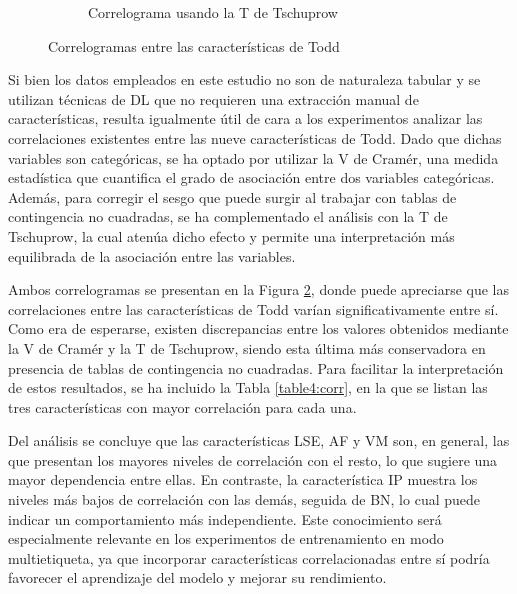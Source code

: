 \begin{figure}[p]
\begin{subfigure}{\textwidth}
        \caption{Correlograma usando la T de Tschuprow}
        \label{fig4:todd_chars__tschuprow}
    \end{subfigure}
    \caption[Correlogramas entre características de Todd]{Correlogramas entre las características de Todd}
    \label{fig4:todd_chars_correlogram}
\end{figure}

Si bien los datos empleados en este estudio no son de naturaleza tabular y se utilizan técnicas de DL que no requieren una extracción manual de características, resulta igualmente útil de cara a los experimentos analizar las correlaciones existentes entre las nueve características de Todd. Dado que dichas variables son categóricas, se ha optado por utilizar la V de Cramér, una medida estadística que cuantifica el grado de asociación entre dos variables categóricas. Además, para corregir el sesgo que puede surgir al trabajar con tablas de contingencia no cuadradas, se ha complementado el análisis con la T de Tschuprow, la cual atenúa dicho efecto y permite una interpretación más equilibrada de la asociación entre las variables.

Ambos correlogramas se presentan en la Figura \ref{fig4:todd_chars_correlogram}, donde puede apreciarse que las correlaciones entre las características de Todd varían significativamente entre sí. Como era de esperarse, existen discrepancias entre los valores obtenidos mediante la V de Cramér y la T de Tschuprow, siendo esta última más conservadora en presencia de tablas de contingencia no cuadradas. Para facilitar la interpretación de estos resultados, se ha incluido la Tabla \ref{table4:corr}, en la que se listan las tres características con mayor correlación para cada una.

Del análisis se concluye que las características LSE, AF y VM son, en general, las que presentan los mayores niveles de correlación con el resto, lo que sugiere una mayor dependencia entre ellas. En contraste, la característica IP muestra los niveles más bajos de correlación con las demás, seguida de BN, lo cual puede indicar un comportamiento más independiente. Este conocimiento será especialmente relevante en los experimentos de entrenamiento en modo multietiqueta, ya que incorporar características correlacionadas entre sí podría favorecer el aprendizaje del modelo y mejorar su rendimiento.

